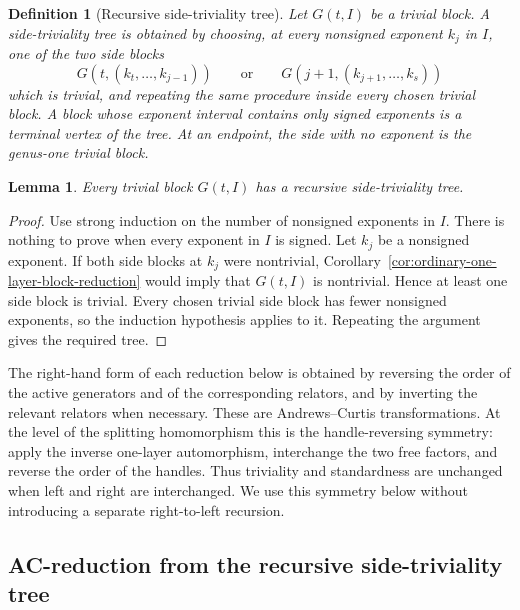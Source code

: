 \documentclass{article}
\newtheorem{lm}[theorem]{Lemma}
\newtheorem{df}[theorem]{Definition}
\begin{document}
\begin{df}[Recursive side-triviality tree]
\label{def:side-triviality-tree}
Let $G(t,I)$ be a trivial block.  A \emph{side-triviality tree} is obtained
by choosing, at every nonsigned exponent $k_j$ in $I$, one of the two side
blocks
\[
 G(t,(k_t,\ldots,k_{j-1}))
 \qquad\text{or}\qquad
 G(j+1,(k_{j+1},\ldots,k_s))
\]
which is trivial, and repeating the same procedure inside every chosen
trivial block.  A block whose exponent interval contains only signed
exponents is a terminal vertex of the tree.  At an endpoint, the side with
no exponent is the genus-one trivial block.
\end{df}

\begin{lm}
\label{lem:recursive-side-triviality}
Every trivial block $G(t,I)$ has a recursive side-triviality tree.
\end{lm}

\begin{proof}
Use strong induction on the number of nonsigned exponents in $I$.  There is
nothing to prove when every exponent in $I$ is signed.  Let $k_j$ be a
nonsigned exponent.  If both side blocks at $k_j$ were nontrivial,
Corollary~\ref{cor:ordinary-one-layer-block-reduction} would imply that
$G(t,I)$ is nontrivial.  Hence at least one side block is trivial.  Every
chosen trivial side block has fewer nonsigned exponents, so the induction
hypothesis applies to it.  Repeating the argument gives the required tree.
\end{proof}

\medskip
\noindent
The right-hand form of each reduction below is obtained by reversing the
order of the active generators and of the corresponding relators, and by
inverting the relevant relators when necessary.  These are Andrews--Curtis
transformations.  At the level of the splitting homomorphism this is the
handle-reversing symmetry: apply the inverse one-layer automorphism, interchange
the two free factors, and reverse the order of the handles.  Thus triviality
and standardness are unchanged when left and right are interchanged.  We use
this symmetry below without introducing a separate right-to-left recursion.

\subsection{AC-reduction from the recursive side-triviality tree}
\label{subsec:recursive-tree-AC-reduction}
\end{document}
